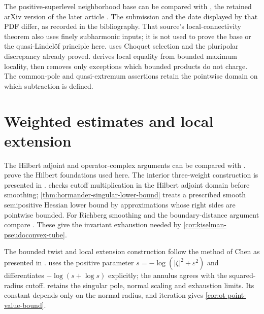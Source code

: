 The positive-superlevel neighborhood base can be compared with \cite[Lemma 3.1, pp.~3--4]{EMW05Plurifine}, the retained arXiv version of the later article \cite{EMW06}. The submission and the date displayed by that PDF differ, as recorded in the bibliography. That source's local-connectivity theorem also uses finely subharmonic inputs; it is not used to prove the base or the quasi-Lindel\"of principle here.  uses Choquet selection and the pluripolar discrepancy already proved.  derives local equality from bounded maximum locality, then removes only exceptions which bounded products do not charge. The common-pole and quasi-extremum assertions retain the pointwise domain on which subtraction is defined.

\section{Weighted estimates and local extension}
\label{sec:history-weighted-extension}
The Hilbert adjoint and operator-complex arguments can be compared with \cite[Chapter VIII, Section 1, pp.~363--365]{DemBook}.  prove the Hilbert foundations used here. The interior three-weight construction is presented in \cite[Lemma 7.2, Proposition 7.3 and Theorem 7.1, pp.~35--39]{Blo14SCV}.  checks cutoff multiplication in the Hilbert adjoint domain before smoothing; \cref{thm:hormander-singular-lower-bound} treats a prescribed smooth semipositive Hessian lower bound by approximations whose right sides are pointwise bounded. For Richberg smoothing and the boundary-distance argument compare \cite[Chapter I, (5.18)--(5.21), pp.~43--44, and (7.1)--(7.2), pp.~53--55]{DemBook}. These give the invariant exhaustion needed by \cref{cor:kiselman-pseudoconvex-tube}.

The bounded twist and local extension construction follow the method of Chen as presented in \cite[Theorems 9.1--9.3 and Lemma 9.4, pp.~46--48]{Blo14SCV}.  uses the positive parameter $s=-\log(|\zeta|^2+\varepsilon^2)$ and differentiates $-\log(s+\log s)$ explicitly; the annulus agrees with the squared-radius cutoff.  retains the singular pole, normal scaling and exhaustion limits. Its constant depends only on the normal radius, and iteration gives \cref{cor:ot-point-value-bound}.

